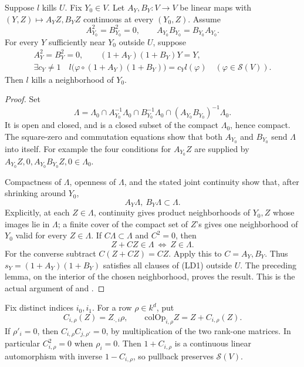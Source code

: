 \begin{srlemma}
\label{lem:sr-source-local-dead}
Suppose \(l\) kills \(U\).
Fix \(Y_0\in V\).
Let \(A_Y,B_Y:V\to V\) be linear maps with
\((Y,Z)\mapsto A_YZ,B_YZ\) continuous at every \((Y_0,Z)\).
Assume
\[
 A_{Y_0}^2=B_{Y_0}^2=0,\qquad
                       A_{Y_0}B_{Y_0}=B_{Y_0}A_{Y_0}.
\]
For every \(Y\) sufficiently near \(Y_0\) outside \(U\), suppose
\[
 \begin{gathered}
 A_Y^2=B_Y^2=0,\qquad
            (1+A_Y)(1+B_Y)Y=Y,\\
 \exists c_Y\ne1\quad
 l\bigl(\varphi\circ(1+A_Y)(1+B_Y)\bigr)
                  =c_Yl(\varphi)\quad(\varphi\in\mathcal S(V)).
 \end{gathered}\tag{LD2}\label{eq:sr-source-local-moving-stabilizer}
\]
Then \(l\) kills a neighborhood of \(Y_0\).
\end{srlemma}
\begin{proof}
Set
\[
 \Lambda=\Lambda_0\cap A_{Y_0}^{-1}\Lambda_0
       \cap B_{Y_0}^{-1}\Lambda_0
       \cap(A_{Y_0}B_{Y_0})^{-1}\Lambda_0.
\]
It is open and closed, and is a closed subset of the compact
\(\Lambda_0\), hence compact.
The square-zero and commutation equations show that both
\(A_{Y_0}\) and \(B_{Y_0}\) send \(\Lambda\) into itself.
For example the four conditions for \(A_{Y_0}Z\) are supplied by
\(A_{Y_0}Z,0,A_{Y_0}B_{Y_0}Z,0\in\Lambda_0\).

Compactness of \(\Lambda\), openness of \(\Lambda\), and the stated
joint continuity show that, after shrinking around \(Y_0\),
\[
                       A_Y\Lambda,\ B_Y\Lambda\subset\Lambda.
\]
Explicitly, at each \(Z\in\Lambda\), continuity gives product
neighborhoods of \(Y_0,Z\) whose images lie in \(\Lambda\);
a finite cover of the compact set of \(Z\)'s gives one
neighborhood of \(Y_0\) valid for every \(Z\in\Lambda\).
If \(C\Lambda\subset\Lambda\) and \(C^2=0\), then
\[
                     Z+CZ\in\Lambda\ \Longleftrightarrow\
                                     Z\in\Lambda.
\]
For the converse subtract \(C(Z+CZ)=CZ\).
Apply this to \(C=A_Y,B_Y\).
Thus \(s_Y=(1+A_Y)(1+B_Y)\) satisfies all clauses of (LD1)
outside \(U\). The preceding lemma, on the interior of the chosen
neighborhood, proves the result.
This is the actual argument of  and .
\end{proof}

Fix distinct indices \(i_0,i_1\).
For a row \(\rho\in k^d\), put
\[
 C_{i,\rho}(Z)=Z_{\cdot,i}\rho,\qquad
                     \mathrm{colOp}_{i,\rho}Z=Z+C_{i,\rho}(Z).
\]
If \(\rho'_i=0\), then
\(C_{i,\rho}C_{j,\rho'}=0\), by multiplication of the two
rank-one matrices.
In particular \(C_{i,\rho}^2=0\) when \(\rho_i=0\).
Then \(1+C_{i,\rho}\) is a continuous linear automorphism with
inverse \(1-C_{i,\rho}\), so pullback preserves \(\mathcal S(V)\).

